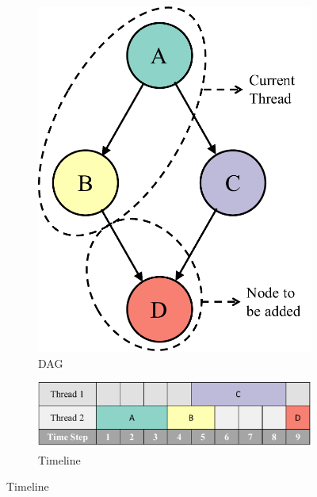 \begin{figure}[htp]
    \centering
    \begin{subfigure}{0.25\textwidth}
    \centering
    \includegraphics[width=\textwidth]{figure/ex_dep.pdf}
    \caption{DAG}
    \label{subfig:dag}
    \end{subfigure}
    \begin{subfigure}{0.7\textwidth}
    \centering
    \vspace{60pt}
    \includegraphics[width=\textwidth]{figure/ex_dep_timeline.pdf}
    \caption{Timeline}
    \label{subfig:timeline}
    \end{subfigure}
    \label{fig:ex_pipeline}
\end{figure}


